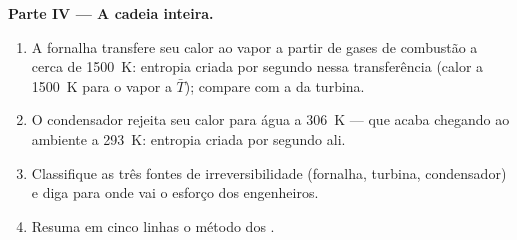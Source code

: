 \begin{problem}
\textbf{Parte IV --- A cadeia inteira.}
\begin{enumerate}[resume]
  \item A fornalha transfere seu calor ao vapor a partir de gases de combustão a
        cerca de \qty{1500}{K}: entropia criada por segundo nessa transferência
        (calor a \qty{1500}{K} para o vapor a $\bar T$); compare com a
        da turbina.
  \item O condensador rejeita seu calor para água a \qty{306}{K} ---
        que acaba chegando ao ambiente a \qty{293}{K}: entropia
        criada por segundo ali.
  \item Classifique as três fontes de irreversibilidade (fornalha, turbina,
        condensador) e diga para onde vai o esforço dos engenheiros.
  \item Resuma em cinco linhas o método dos .
\end{enumerate}
\end{problem}
